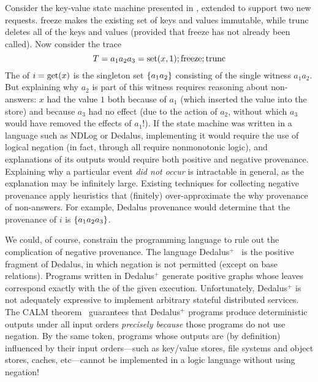 Consider the key-value state machine presented in ,
extended to support two new requests. freeze makes the existing set of keys and
values immutable, while trunc deletes all of the keys and values (provided that
freeze has not already been called). Now consider the trace
\[
  T = a_1 a_2 a_3 = \text{set}(x,1); \text{freeze}; \text{trunc}
\]
The \watprovenance{} of $i = \text{get}(x)$ is the singleton set $\{a_1a_2\}$
consisting of the single witness $a_1a_2$. But explaining why $a_2$ is part of
this witness requires reasoning about non-answers: $x$ had the value $1$ both
because of $a_1$ (which inserted the value into the store) and because $a_3$
had no effect (due to the action of $a_2$, without which $a_3$ would have
removed the effects of $a_1$!). If the state machine was written in a language
such as NDLog or Dedalus, implementing it would require the use of logical
negation (in fact,  through
 all require nonmonotonic logic), and
explanations of its outputs would require both positive and negative
provenance.  Explaining why a particular event \emph{did not occur} is
intractable in general, as the explanation may be infinitely large.  Existing
techniques for collecting negative provenance apply heuristics that (finitely)
over-approximate the why provenance of non-answers. For example, Dedalus
provenance would determine that the provenance of $i$ is $\{a_1a_2a_3\}$.

\newcommand{\dedalusplus}{Dedalus$^+$}
We could, of course, constrain the programming language to rule out the
complication of negative provenance.  The language
\dedalusplus~\cite{marczak2012confluence} is the positive fragment of Dedalus,
in which negation is not permitted (except on base relations). Programs written
in \dedalusplus{} generate positive \whyprovenance{} graphs whose leaves
correspond exactly with the \watprovenance{} of the given execution.
Unfortunately, \dedalusplus{} is not adequately expressive to implement
arbitrary stateful distributed services. The CALM
theorem~\cite{alvaro2011consistency,ameloot2013transducers} guarantees that
\dedalusplus{} programs produce deterministic outputs under all input orders
\emph{precisely because} those programs do not use negation. By the same token,
programs whose outputs are (by definition) influenced by their input
orders---such as key/value stores, file systems and object stores, caches,
etc---cannot be implemented in a logic language without using negation!

